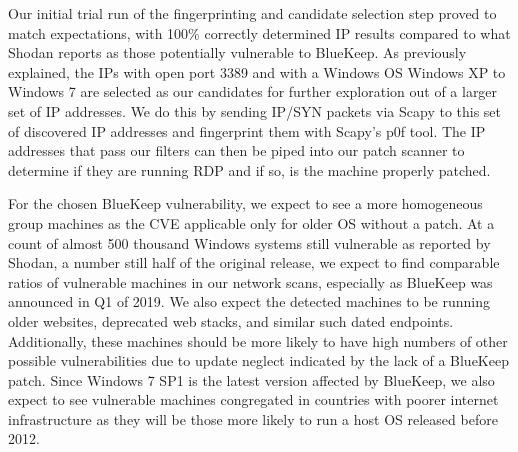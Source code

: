 Our initial trial run of the fingerprinting and candidate selection step proved to match expectations, with 100\% correctly determined IP results compared to what Shodan reports as those potentially vulnerable to BlueKeep. As previously explained, the IPs with open port 3389 and with a Windows OS Windows XP to Windows 7 are selected as our candidates for further exploration out of a larger set of IP addresses. We do this by sending IP/SYN packets via Scapy to this set of discovered IP addresses and fingerprint them with Scapy's p0f tool. The IP addresses that pass our filters can then be piped into our patch scanner to determine if they are running RDP and if so, is the machine properly patched.

For the chosen BlueKeep vulnerability, we expect to see a more homogeneous group machines as the CVE applicable only for older OS without a patch. At a count of almost 500 thousand Windows systems still vulnerable as reported by Shodan, a number still half of the original release, we expect to find comparable ratios of vulnerable machines in our network scans, especially as BlueKeep was announced in Q1 of 2019. We also expect the detected machines to be running older websites, deprecated web stacks, and similar such dated endpoints. Additionally, these machines should be more likely to have high numbers of other possible vulnerabilities due to update neglect indicated by the lack of a BlueKeep patch. Since Windows 7 SP1 is the latest version affected by BlueKeep, we also expect to see vulnerable machines congregated in countries with poorer internet infrastructure as they will be those more likely to run a host OS released before 2012.